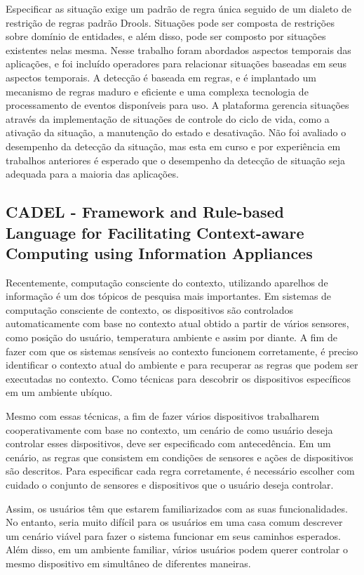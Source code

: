 \documentclass[12pt,a4paper,compsoc]{IEEEtran}
\begin{document}
  Especificar as situação exige um padrão de regra única seguido de um dialeto de restrição de
  regras padrão Drools. Situações pode ser composta de restrições sobre domínio de entidades, e
  além disso, pode ser composto por situações existentes nelas mesma. Nesse trabalho foram
  abordados aspectos temporais das aplicações, e foi incluído operadores para relacionar situações
  baseadas em seus aspectos temporais. A detecção é baseada em regras, e é implantado um mecanismo
  de regras maduro e eficiente e uma complexa tecnologia de processamento de eventos disponíveis
  para uso. A plataforma gerencia situações através da implementação de situações de controle do
  ciclo de vida, como a ativação da situação, a manutenção do estado e desativação. Não foi
  avaliado o desempenho da detecção da situação, mas esta em curso e por experiência em trabalhos
  anteriores é esperado que o desempenho da detecção de situação seja adequada para a maioria das
  aplicações.


\subsection{CADEL - Framework and Rule-based Language for Facilitating Context-aware Computing
 using Information Appliances}

  Recentemente, computação consciente do contexto, utilizando aparelhos de informação é um dos
  tópicos de pesquisa mais importantes. Em sistemas de computação consciente de contexto, os
  dispositivos são controlados automaticamente com base no contexto atual obtido a partir de vários
  sensores, como posição do usuário, temperatura ambiente e assim por diante. A fim de fazer com
  que os sistemas sensíveis ao contexto funcionem corretamente, é preciso identificar o contexto
  atual do ambiente e para recuperar as regras que podem ser executadas no contexto. Como técnicas
  para descobrir os dispositivos específicos em um ambiente ubíquo.
  
  Mesmo com essas técnicas, a fim de fazer vários dispositivos trabalharem cooperativamente com base
  no contexto, um cenário de como usuário deseja controlar esses dispositivos, deve ser especificado
  com antecedência. Em um cenário, as regras que consistem em condições de sensores e ações de
  dispositivos são descritos. Para especificar cada regra corretamente, é necessário escolher com
  cuidado o conjunto de sensores e dispositivos que o usuário deseja controlar.
  
  Assim, os usuários têm que estarem familiarizados com as suas funcionalidades. No entanto, seria
  muito difícil para os usuários em uma casa comum descrever um cenário viável para fazer o sistema
  funcionar em seus caminhos esperados. Além disso, em um ambiente familiar, vários usuários podem
  querer controlar o mesmo dispositivo em simultâneo de diferentes maneiras.
  
\end{document}
